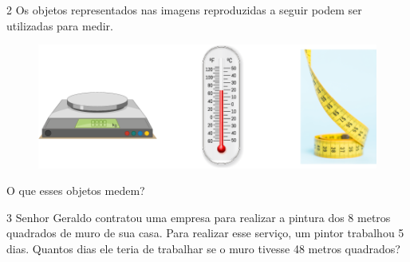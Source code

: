 \num{2} Os objetos representados nas imagens reproduzidas a seguir podem ser utilizadas para medir.

\begin{figure}[htpb!]
\centering
\includegraphics[width=\textwidth]{media/image70.png}
\end{figure}

O que esses objetos medem?

\num{3} Senhor Geraldo contratou uma empresa para realizar a pintura dos 8
metros quadrados de muro de sua casa. Para realizar esse serviço, um pintor
trabalhou 5 dias. Quantos dias ele teria de trabalhar se o muro tivesse
48 metros quadrados?\enlargethispage{2\baselineskip}

